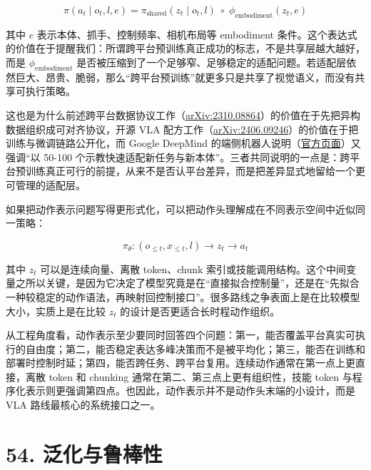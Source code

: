 \begingroup
\scriptsize
\begin{equation*}
\pi(a_t \mid o_t, l, e)
= \pi_{\text{shared}}(z_t \mid o_t, l)\;
\circ\;
\phi_{\text{embodiment}}(z_t, e)
\end{equation*}
\endgroup

其中 \(e\) 表示本体、抓手、控制频率、相机布局等 embodiment 条件。这个表达式的价值在于提醒我们：所谓跨平台预训练真正成功的标志，不是共享层越大越好，而是 \(\phi_{\text{embodiment}}\) 是否被压缩到了一个足够窄、足够稳定的适配问题。若适配层依然巨大、昂贵、脆弱，那么“跨平台预训练”就更多只是共享了视觉语义，而没有共享可执行策略。

这也是为什么前述跨平台数据协议工作（\href{https://arxiv.org/abs/2310.08864}{arXiv:2310.08864}）的价值在于先把异构数据组织成可对齐协议，开源 VLA 配方工作（\href{https://arxiv.org/abs/2406.09246}{arXiv:2406.09246}）的价值在于把训练与微调链路公开化，而 Google DeepMind 的端侧机器人说明（\href{https://deepmind.google/blog/gemini-robotics-on-device-brings-ai-to-local-robotic-devices/}{官方页面}）又强调“以 50-100 个示教快速适配新任务与新本体”。三者共同说明的一点是：跨平台预训练真正可行的前提，从来不是否认平台差异，而是把差异显式地留给一个更可管理的适配层。

如果把动作表示问题写得更形式化，可以把动作头理解成在不同表示空间中近似同一策略：

\begingroup
\footnotesize
\begin{equation*}
\pi_\theta : (o_{\le t}, x_{\le t}, l) \rightarrow z_t \rightarrow a_t
\end{equation*}
\endgroup

其中 \(z_t\) 可以是连续向量、离散 token、chunk 索引或技能调用结构。这个中间变量之所以关键，是因为它决定了模型究竟是在“直接拟合控制量”，还是在“先拟合一种较稳定的动作语法，再映射回控制接口”。很多路线之争表面上是在比较模型大小，实质上是在比较 \(z_t\) 的设计是否更适合长时程动作组织。

从工程角度看，动作表示至少要同时回答四个问题：第一，能否覆盖平台真实可执行的自由度；第二，能否稳定表达多峰决策而不是被平均化；第三，能否在训练和部署时控制时延；第四，能否跨任务、跨平台复用。连续动作通常在第一点上更直接，离散 token 和 chunking 通常在第二、第三点上更有组织性，技能 token 与程序化表示则更强调第四点。也因此，动作表示并不是动作头末端的小设计，而是 VLA 路线最核心的系统接口之一。

\section*{54. 泛化与鲁棒性}

